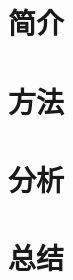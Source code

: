 \documentclass{si_template/cn_note}
\begin{document}
\frontmatter
\mainmatter
\chapter{简介}\label{chap:introduction}

\chapter{方法}\label{chap:method}

\chapter{分析}\label{chap:analysis}

\chapter{总结}\label{chap:conclusion}


\backmatter
\end{document}
